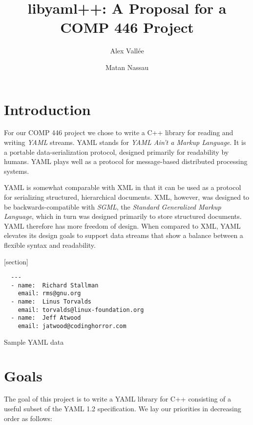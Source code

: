 \documentclass{article}
\author{Alex Vall\'ee \and Matan Nassau}
\title{libyaml++:  A Proposal for a COMP 446 Project}
\begin{document}
\maketitle

\section{Introduction}
For our COMP 446 project we chose to write a C++ library for reading and writing \emph{YAML} streams.  YAML stands for \emph{YAML Ain't a Markup Language}.  It is a portable data-serialization protocol, designed primarily for readability by humans.  YAML plays well as a protocol for message-based distributed processing systems.

YAML is somewhat comparable with XML in that it can be used as a protocol for serializing structured, hierarchical documents.  XML, however, was designed to be backwards-compatible with \emph{SGML}, the \emph{Standard Generalized Markup Language}, which in turn was designed primarily to store structured documents.  YAML therefore has more freedom of design.  When compared to XML, YAML elevates its design goals to support data streams that show a balance between a flexible syntax and readability.

[section]
\begin{Figure}
  \begin{verbatim}
  ---
  - name:  Richard Stallman
    email: rms@gnu.org
  - name:  Linus Torvalds
    email: torvalds@linux-foundation.org
  - name:  Jeff Atwood
    email: jatwood@codinghorror.com
  \end{verbatim}
  \caption{Sample YAML data}
\end{Figure}

\section{Goals}

The goal of this project is to write a YAML library for C++ consisting of a useful subset of the YAML 1.2 specification.  We lay our priorities in decreasing order as follows:
\end{document}
